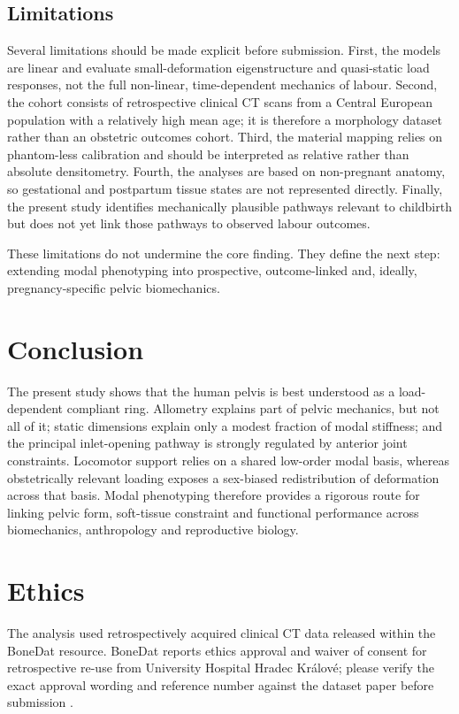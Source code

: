 \documentclass[11pt,a4paper]{article}
\begin{document}
\subsection{Limitations}

Several limitations should be made explicit before submission. First, the models are linear and evaluate small-deformation eigenstructure and quasi-static load responses, not the full non-linear, time-dependent mechanics of labour. Second, the cohort consists of retrospective clinical CT scans from a Central European population with a relatively high mean age; it is therefore a morphology dataset rather than an obstetric outcomes cohort. Third, the material mapping relies on phantom-less calibration and should be interpreted as relative rather than absolute densitometry. Fourth, the analyses are based on non-pregnant anatomy, so gestational and postpartum tissue states are not represented directly. Finally, the present study identifies mechanically plausible pathways relevant to childbirth but does not yet link those pathways to observed labour outcomes.

These limitations do not undermine the core finding. They define the next step: extending modal phenotyping into prospective, outcome-linked and, ideally, pregnancy-specific pelvic biomechanics.

\section{Conclusion}

The present study shows that the human pelvis is best understood as a load-dependent compliant ring. Allometry explains part of pelvic mechanics, but not all of it; static dimensions explain only a modest fraction of modal stiffness; and the principal inlet-opening pathway is strongly regulated by anterior joint constraints. Locomotor support relies on a shared low-order modal basis, whereas obstetrically relevant loading exposes a sex-biased redistribution of deformation across that basis. Modal phenotyping therefore provides a rigorous route for linking pelvic form, soft-tissue constraint and functional performance across biomechanics, anthropology and reproductive biology.

\section*{Ethics}

The analysis used retrospectively acquired clinical CT data released within the BoneDat resource. BoneDat reports ethics approval and waiver of consent for retrospective re-use from University Hospital Hradec Kr\'alov\'e; please verify the exact approval wording and reference number against the dataset paper before submission \citep{HenysKuchar2025}.
\end{document}
